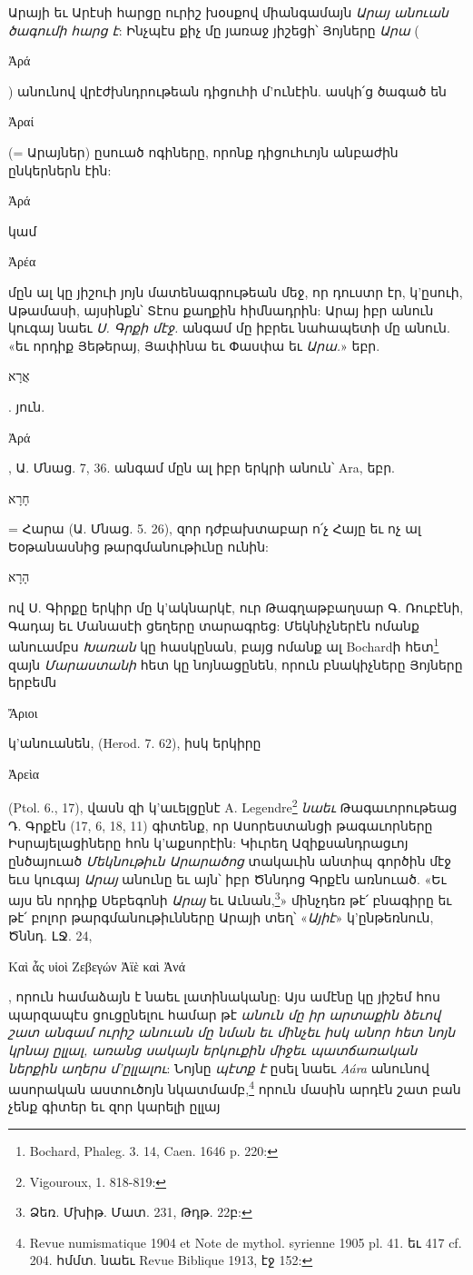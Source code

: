 \documentclass{article}
\begin{document}
{Արայի եւ Արէսի հարցը ուրիշ խօսքով միանգամայն \emph{Արայ անուան ծագումի հարց է}: Ինչպէս քիչ մը յառաջ յիշեցի՝ Յոյները \emph{Արա} (\begin{greek}Ἀρά\end{greek}) անունով վրէժխնդրութեան դիցուհի մ'ունէին. ասկի՛ց ծագած են \begin{greek}Ἀραί\end{greek} (= Արայներ) ըսուած ոգիները, որոնք դիցուհւոյն անբաժին ընկերներն էին: \begin{greek}Ἀρά\end{greek} կամ \begin{greek}Ἀρέα\end{greek} մըն ալ կը յիշուի յոյն մատենագրութեան մեջ, որ դուստր էր, կ'ըսուի, Աթամասի, այսինքն՝ Տէոս քաղքին հիմնադրին: Արայ իբր անուն կուգայ նաեւ \emph{Ս. Գրքի մէջ.} անգամ մը իբրեւ նահապետի մը անուն. «եւ որդիք Յեթերայ, Յափինա եւ Փասփա եւ \emph{Արա.}» եբր. \begin{hebrewfont}אֲרָא\end{hebrewfont}. յուն. \begin{greek}Ἀρά\end{greek}, Ա. Մնաց. 7, 36. անգամ մըն ալ իբր երկրի անուն՝ Ara, եբր. \begin{hebrewfont}חָרָא\end{hebrewfont} = Հարա (Ա. Մնաց. 5. 26), զոր դժբախտաբար ո՛չ Հայը եւ ոչ ալ Եօթանասնից թարգմանութիւնը ունին: \begin{hebrewfont}הָרָא\end{hebrewfont} ով Ս. Գիրքը երկիր մը կ'ակնարկէ, ուր Թագղաթբաղսար Գ. Ռուբէնի, Գադայ եւ Մանասէի ցեղերը տարագրեց: Մեկնիչներէն ոմանք անուամբս \emph{Խառան} կը հասկընան, բայց ոմանք ալ Bochardի հետ\footnote{Bochard, Phaleg. 3. 14, Caen. 1646 p. 220:} զայն \emph{Մարաստանի} հետ կը նոյնացընեն, որուն բնակիչները Յոյները երբեմն \begin{greek}Ἄριοι\end{greek} կ'անուանեն, (Herod. 7. 62), իսկ երկիրը \begin{greek}Ἀρεὶα\end{greek} (Ptol. 6., 17), վասն զի կ'աւելցընէ A. Legendre\footnote{Vigouroux, 1. 818-819:} \emph{նաեւ} Թագաւորութեաց Դ. Գրքէն (17, 6, 18, 11) գիտենք, որ Ասորեստանցի թագաւորները Իսրայելացիները հոն կ'աքսորէին: Կիւրեղ Ազիքսանդրացւոյ ընծայուած \emph{Մեկնութիւն Արարածոց} տակաւին անտիպ գործին մէջ եւս կուգայ \emph{Արայ} անունը եւ այն՝ իբր Ծննդոց Գրքէն առնուած. «Եւ այս են որդիք Սեբեգոնի \emph{Արայ} եւ Աւնան,\footnote{Ձեռ. Մխիթ. Մատ. 231, Թդթ. 22բ:}» մինչդեռ թէ՛ բնագիրը եւ թէ՛ բոլոր թարգմանութիւնները Արայի տեղ՝ «\emph{Այիէ}» կ'ընթեռնուն, Ծննդ. ԼՋ. 24, \begin{greek}Καὶ ἇς υἱοὶ Ζεβεγών Ἀϊὲ καὶ Ἀνά\end{greek}, որուն համաձայն է նաեւ լատինականը: Այս ամէնը կը յիշեմ հոս պարզապէս ցուցընելու համար թէ \emph{անուն մը իր արտաքին ձեւով շատ անգամ ուրիշ անուան մը նման եւ մինչեւ իսկ անոր հետ նոյն կրնայ ըլլալ, առանց սակայն երկուքին միջեւ պատճառական ներքին աղերս մ'ըլլալու}: Նոյնը \emph{պէտք է} ըսել նաեւ \emph{Aára} անունով ասորական աստուծոյն նկատմամբ,\footnote{Revue numismatique 1904 et Note de mythol. syrienne 1905 pl. 41. եւ 417 cf. 204. հմմտ. նաեւ Revue Biblique 1913, էջ 152:} որուն մասին արդէն շատ բան չենք գիտեր եւ զոր կարելի ըլլայ }
\end{document}
